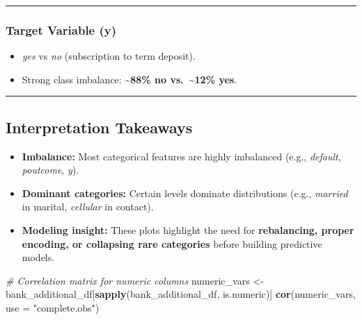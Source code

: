\documentclass[
]{article}
\newenvironment{Shaded}{\begin{snugshade}}{\end{snugshade}}
\newcommand{\AttributeTok}[1]{\textcolor[rgb]{0.13,0.29,0.53}{#1}}
\newcommand{\CommentTok}[1]{\textcolor[rgb]{0.56,0.35,0.01}{\textit{#1}}}
\newcommand{\FunctionTok}[1]{\textcolor[rgb]{0.13,0.29,0.53}{\textbf{#1}}}
\newcommand{\NormalTok}[1]{#1}
\newcommand{\OtherTok}[1]{\textcolor[rgb]{0.56,0.35,0.01}{#1}}
\newcommand{\StringTok}[1]{\textcolor[rgb]{0.31,0.60,0.02}{#1}}
\providecommand{\tightlist}{%
  \setlength{\itemsep}{0pt}\setlength{\parskip}{0pt}}
\begin{document}
\begin{center}\rule{0.5\linewidth}{0.5pt}\end{center}

\subsubsection{Target Variable (y)}\label{target-variable-y}

\begin{itemize}
\tightlist
\item
  \emph{yes} vs \emph{no} (subscription to term deposit).\\
\item
  Strong class imbalance: \textbf{\textasciitilde88\% no
  vs.~\textasciitilde12\% yes}.
\end{itemize}

\begin{center}\rule{0.5\linewidth}{0.5pt}\end{center}

\subsection{Interpretation Takeaways}\label{interpretation-takeaways}

\begin{itemize}
\tightlist
\item
  \textbf{Imbalance:} Most categorical features are highly imbalanced
  (e.g., \emph{default}, \emph{poutcome}, \emph{y}).\\
\item
  \textbf{Dominant categories:} Certain levels dominate distributions
  (e.g., \emph{married} in marital, \emph{cellular} in contact).\\
\item
  \textbf{Modeling insight:} These plots highlight the need for
  \textbf{rebalancing, proper encoding, or collapsing rare categories}
  before building predictive models.
\end{itemize}

\begin{Shaded}
\begin{Highlighting}[]
\CommentTok{\# Correlation matrix for numeric columns}
\NormalTok{numeric\_vars }\OtherTok{\textless{}{-}}\NormalTok{ bank\_additional\_df[}\FunctionTok{sapply}\NormalTok{(bank\_additional\_df, is.numeric)]}
\FunctionTok{cor}\NormalTok{(numeric\_vars, }\AttributeTok{use =} \StringTok{"complete.obs"}\NormalTok{)}
\end{Highlighting}
\end{Shaded}
\end{document}
